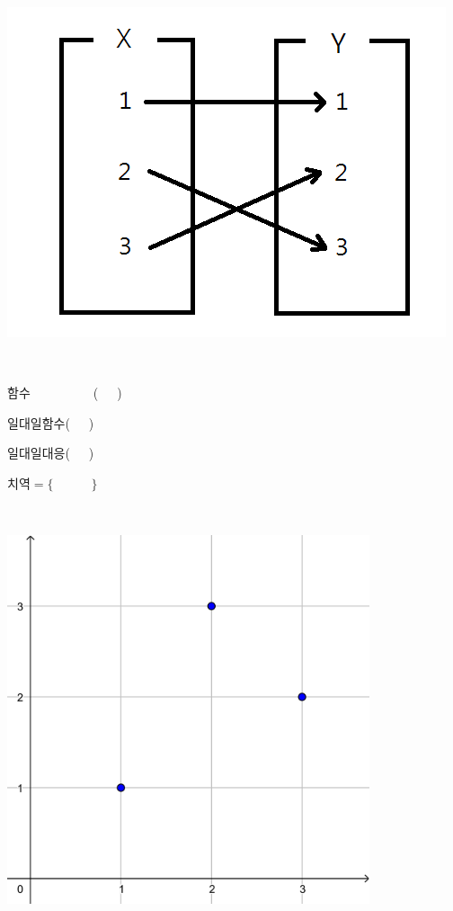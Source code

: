 \documentclass[a4paper]{oblivoir}
\begin{document}
%
\begin{minipage}{0.4\textwidth}
\includegraphics[width=\textwidth]{onetoonecorrespondence}
\end{minipage}
~
\begin{minipage}{0.20\textwidth}
함수~~~~~~~~~~(~~~)\par\bigskip
일대일함수(~~~)\par\bigskip
일대일대응(~~~)\par\bigskip
치역\(=\{\qquad\quad\}\)
\end{minipage}
~
\begin{minipage}{0.35\textwidth}
\includegraphics[width=0.8\textwidth]{onetoonecorrespondence-}
\end{minipage}
\end{document}
